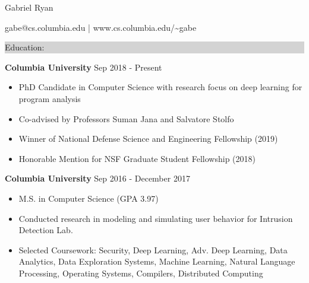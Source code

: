 \documentclass{article} %
\newcommand{\rsection}[1]{
  \hspace{-0.4cm}\vspace{0.1cm}
\colorbox{lightgrey}{
\begin{minipage}{1.07\linewidth}
\vspace{0.22cm}
\fontsize{14pt}{16pt}\selectfont #1 
\vspace{0.12cm}
\end{minipage}
}
\vspace*{-0.1cm}
}
\newcommand{\rjob}[2]{
  \hspace*{-0.3cm}
{\fontsize{10pt}{12pt}\selectfont #1} \hfill #2 
\vspace*{0.1cm} 
\hspace*{-1.2cm}
}
\newenvironment{ritemize}{
\hspace*{-0.8cm} 
\begin{minipage}{1.05\linewidth}
\begin{itemize}
}{
\end{itemize}
\end{minipage}
}
\newcommand{\ritem}{
\item[-]
}
\begin{document}
\hspace*{-0.45cm} 
{\fontsize{22pt}{22pt}\selectfont Gabriel Ryan}\\
\begin{minipage}{\linewidth}
\vspace{0.1cm}
  {\fontsize{12}{12}\selectfont
    gabe@cs.columbia.edu | www.cs.columbia.edu/\textasciitilde gabe
  }
\end{minipage}
\vspace{-0.15cm}


\rsection{Education:} 

\rjob{\textbf{Columbia University}}{Sep 2018 - Present}\\
\begin{ritemize}
\ritem PhD Candidate in Computer Science with research focus on deep learning for program analysis
\ritem Co-advised by Professors Suman Jana and  Salvatore Stolfo
\ritem Winner of National Defense Science and Engineering Fellowship (2019)
\ritem Honorable Mention for NSF Graduate Student Fellowship (2018)
\end{ritemize}

\rjob{\textbf{Columbia University}}{Sep 2016 - December 2017}\\
\begin{ritemize}
  \ritem M.S. in Computer Science (GPA 3.97)
  \ritem Conducted research in modeling and simulating user behavior for Intrusion Detection Lab.
  \ritem Selected Coursework: Security, Deep Learning, Adv. Deep Learning, Data Analytics, Data Exploration Systems, Machine Learning, Natural Language Processing, Operating Systems, Compilers, Distributed Computing
\end{ritemize}
\end{document}
